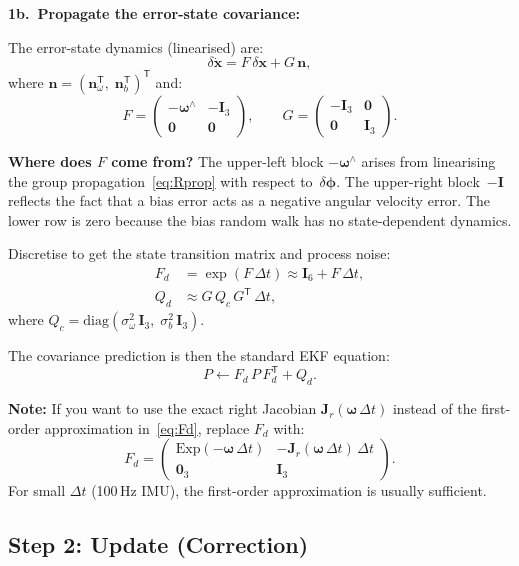 \documentclass[11pt,letterpaper]{article}
\newcommand{\expmap}{\mathrm{Exp}}
\newcommand{\eye}{\mathbf{I}}
\begin{document}
\medskip
\noindent\textbf{1b.\ Propagate the error-state covariance:}

The error-state dynamics (linearised) are:
\[
  \delta\dot{\mathbf{x}}
  = F\,\delta\mathbf{x} + G\,\mathbf{n},
\]
where $\mathbf{n} = (\mathbf{n}_{\omega}^{\mathsf{T}},\;
\mathbf{n}_{b}^{\mathsf{T}})^{\mathsf{T}}$ and:
\[
  F = \begin{pmatrix}
    -\bm{\omega}^{\wedge} & -\eye_{3} \\[3pt]
    \mathbf{0} & \mathbf{0}
  \end{pmatrix},
  \qquad
  G = \begin{pmatrix}
    -\eye_{3} & \mathbf{0} \\[3pt]
    \mathbf{0} & \eye_{3}
  \end{pmatrix}.
\]

\textbf{Where does $F$ come from?}  The upper-left block
$-\bm{\omega}^{\wedge}$ arises from linearising the group
propagation~\eqref{eq:Rprop} with respect to~$\delta\bm{\phi}$.
The upper-right block~$-\eye$ reflects the fact that a bias error
acts as a negative angular velocity error.  The lower row is zero
because the bias random walk has no state-dependent dynamics.

Discretise to get the state transition matrix and process noise:
\begin{align}
  F_{d} &= \exp(F\,\Delta t)
    \approx \eye_{6} + F\,\Delta t, \label{eq:Fd}\\
  Q_{d} &\approx G\,Q_{c}\,G^{\mathsf{T}}\,\Delta t,
    \label{eq:Qd}
\end{align}
where $Q_{c} = \text{diag}(\sigma_{\omega}^{2}\,\eye_{3},\;
\sigma_{b}^{2}\,\eye_{3})$.

The covariance prediction is then the standard EKF equation:
\[
  \boxed{P \leftarrow F_{d}\,P\,F_{d}^{\mathsf{T}} + Q_{d}.}
\]

\textbf{Note:}  If you want to use the exact right Jacobian
$\mathbf{J}_{r}(\bm{\omega}\,\Delta t)$ instead of the
first-order approximation in~\eqref{eq:Fd}, replace $F_d$ with:
\[
  F_{d} = \begin{pmatrix}
    \expmap(-\bm{\omega}\,\Delta t) &
    -\mathbf{J}_{r}(\bm{\omega}\,\Delta t)\,\Delta t \\
    \mathbf{0}_{3} & \eye_{3}
  \end{pmatrix}.
\]
For small $\Delta t$ (100\,Hz IMU), the first-order approximation
is usually sufficient.

\subsection{Step 2: Update (Correction)}
\end{document}
